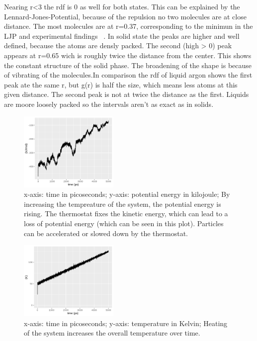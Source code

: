 \documentclass[10pt, a4paper, oneside, twocolumn]{article}
\begin{document}
Nearing r<3 the rdf is 0 as well for both states. This can be explained by the Lennard-Jones-Potential, because of the repulsion no two molecules are at close distance. The most molecules are at r=0.37, corresponding to the minimun in the LJP and experimental findings ~\cite{Argon, RDF}.
In solid state the peaks are higher and well defined, because the atoms are densly packed. The second (high > 0) peak appears at r=0.65 wich is roughly twice the distance from the center. This shows the constant structure of the solid phase. The broadening of the shape is because of vibrating of the molecules.In comparison the rdf of liquid argon shows the first peak ate the same r, but g(r) is half the size, which means less atoms at this given distance. The second peak is not at twice the distance as the first. Liquids are moore loosely packed so the intervals aren't as exact as in solids.

\begin{figure}[t]
    \centering
    \includegraphics[width=180px]{plots/Heatup/pot_energy_heatup.png}
    \caption{x-axis: time in picoseconds; y-axis: potential energy in kilojoule; By increasing the tempreature of the system, the potential energy is rising. The thermostat fixes the kinetic energy, which can lead to a loss of potential energy (which can be seen in this plot). Particles can be accelerated or slowed down by the thermostat.}
    \label{heatup_potentialenergy}
\end{figure}

\begin{figure}[t]
    \centering
    \includegraphics[width=180px]{plots/Heatup/temp_heatup.png}
    \caption{x-axis: time in picoseconds; y-axis: temperature in Kelvin; Heating of the system increases the overall temperature over time.}
    \label{heatup_tempreature}
\end{figure}
\end{document}
